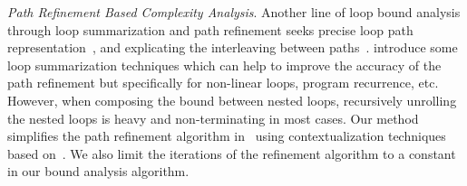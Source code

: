 \emph{Path Refinement Based Complexity Analysis}.
Another line of loop bound analysis through loop summarization and path refinement seeks precise loop path representation~\cite{ManoliosV06,BalakrishnanSIG09,SharmaDDA11,Flores-MontoyaH14,HumenbergerJK18,CyphertBKR19}, and explicating the interleaving between paths~\cite{GulwaniJK09,ZulegerGSV11}.
\cite{KincaidBCR19,KincaidCBR18,BreckCKR20} introduce some loop summarization techniques which can help to improve the accuracy of the path refinement but specifically for non-linear loops, program recurrence, etc.
However, when composing the bound between nested loops, recursively unrolling the nested loops is heavy and non-terminating in most cases.
%
Our method simplifies the path refinement algorithm in~\cite{GulwaniJK09} using contextualization techniques based on~\cite{ZulegerGSV11,SinnZV14,ManoliosV06}.
We also limit the iterations of the refinement algorithm to a constant in our bound analysis algorithm.